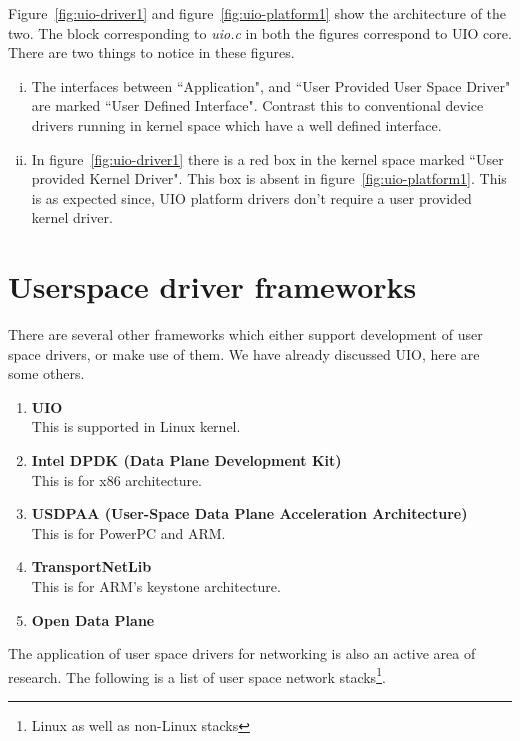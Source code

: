 \documentclass[twoside]{iitbreport}
\begin{document}
Figure~\ref{fig:uio-driver1} and figure~\ref{fig:uio-platform1} show the architecture of the two. The block corresponding to \textit{uio.c} in both the figures correspond to UIO core. There are two things to notice in these figures.

\begin{enumerate}[(i)]
\item The interfaces between ``Application", and ``User Provided User Space Driver" are marked ``User Defined Interface". Contrast this to conventional device drivers running in kernel space which have a well defined interface.
\item In figure~\ref{fig:uio-driver1} there is a red box in the kernel space marked ``User provided Kernel Driver". This box is absent in figure~\ref{fig:uio-platform1}. This is as expected since, UIO platform drivers don't require a user provided kernel driver.
\end{enumerate}

\section{Userspace driver frameworks}
There are several other frameworks which either support development of user space drivers, or make use of them. We have already discussed UIO, here are some others.

\begin{enumerate}
\item \textbf{UIO}\\
This is supported in Linux kernel.
\item \textbf{Intel DPDK (Data Plane Development Kit)}\\
This is for x86 architecture.
\item \textbf{USDPAA (User-Space Data Plane Acceleration Architecture)}\\
This is for PowerPC and ARM.
\item \textbf{TransportNetLib}\\
This is for ARM's keystone architecture.
\item \textbf{Open Data Plane}\\
\end{enumerate}

The application of user space drivers for networking is also an active area of research. The following is a list of user space network stacks\footnote{Linux as well as non-Linux stacks}.
\end{document}
